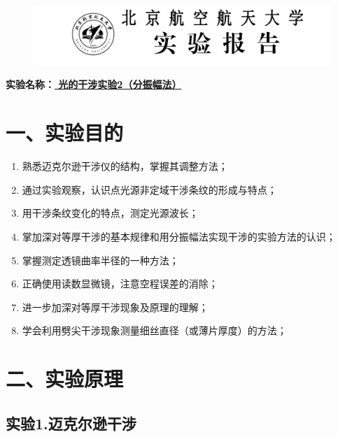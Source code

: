 \documentclass[11pt,a4paper,oneside]{article}
\begin{document}
\begin{figure}[H]
 \centering
  \includegraphics[width=13cm]{Image/表头.png}
\end{figure}
\begin{center}
\textbf{{\large 实验名称：\uline{          光的干涉实验2（分振幅法）     }}}
\end{center}

\section*{一、实验目的}
\begin{enumerate}
\item 熟悉迈克尔逊干涉仪的结构，掌握其调整方法；
\item 通过实验观察，认识点光源非定域干涉条纹的形成与特点；
\item 用干涉条纹变化的特点，测定光源波长；
\item 掌加深对等厚干涉的基本规律和用分振幅法实现干涉的实验方法的认识；
\item 掌握测定透镜曲率半径的一种方法；
\item 正确使用读数显微镜，注意空程误差的消除；
\item 进一步加深对等厚干涉现象及原理的理解；
\item 学会利用劈尖干涉现象测量细丝直径（或薄片厚度）的方法；
\end{enumerate}

\section*{二、实验原理}
\subsection*{实验1.迈克尔逊干涉}
\end{document}
